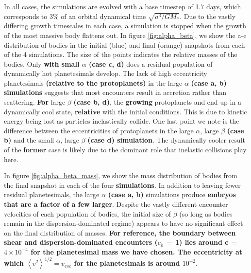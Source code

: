\documentclass[twocolumn,linenumbers]{aastex63}
\begin{document}
In all cases, the simulations are evolved with a base timestep of 1.7
days, which corresponds to 3\% of an orbital dynamical time
$\sqrt{a^3/G M_{*}}$. Due to the vastly differing growth timescales in
each case, a simulation is stopped when the growth of the most massive
body flattens out. In figure \ref{fig:alpha_beta}, we show the a-e
distribution of bodies in the initial (blue) and final (orange)
snapshots from each of the 4 simulations. The size of the points
indicates the relative masses of the bodies. Only \textbf{with small
$\alpha$ (case c, d)} does a residual population of dynamically hot planetesimals
develop. The lack of high eccentricity planetesimals \textbf{(relative to the protoplanets)} in the large
$\alpha$ \textbf{(case a, b) simulations} suggests that most encounters result in accretion
rather than scattering. \textbf{For} large $\beta$ \textbf{(case b, d)}, the \textbf{growing} protoplanets
and end up in a dynamically cool state,
\textbf{relative} with the initial conditions. This is due to kinetic energy 
being lost as particles inelastically collide. One last point we note
is the difference between the eccentricities of protoplanets in the 
large $\alpha$, large $\beta$ \textbf{(case b)} and the small $\alpha$,
large $\beta$ \textbf{(case d) simulation}. The dynamically cooler result of the \textbf{former} case
is likely due to the dominant role that inelastic collisions play here.

In figure \ref{fig:alpha_beta_mass}, we show the mass distribution of bodies from the final snapshot in each of the four \textbf{simulations}. In addition to 
leaving fewer residual planetesimals, the large $\alpha$ \textbf{(case a, b)} simulations produce \textbf{embryos that are a factor of a few larger}. Despite the 
vastly different encounter velocities of each population of bodies, the initial size of $\beta$ (so long as bodies remain in the dispersion-dominated regime) 
appears to have no significant effect on the final distribution of masses. \textbf{For reference, the boundary between shear and dispersion-dominated 
encounters ($e_{h}$ = 1) lies around e = $4 \times 10^{-4}$ for the planetesimal mass we have chosen. The eccentricity at which $\left< v^{2} \right>^{1/2} = 
v_{esc}$ for the planetesimals is around $10^{-2}$.}
\end{document}
